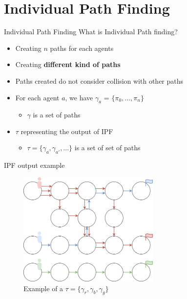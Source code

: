 \section{Individual Path Finding}
\begin{frame}{Individual Path Finding}
    What is Individual Path finding?
    \begin{itemize}
        \item Creating \(n\) paths for each agents
        \item Creating \textbf{different kind of paths}
        \item Paths created do not consider collision with other paths
    \end{itemize}
    \begin{itemize}
        \item For each agent \(a\), we have \(\gamma_a\) = \(\{\pi_0,\dots,\pi_n\}\)
        \begin{itemize}
            \item \(\gamma\) is a set of paths
        \end{itemize}
        \item \(\tau\) representing the output of IPF 
        \begin{itemize}
            \item \(\tau = \{\gamma_a, \gamma_{a'}, ...\}\) is a set of set of paths
        \end{itemize}
    \end{itemize}
\end{frame}


\begin{frame}{IPF output example}
    \begin{figure}[H]
        \centering
        \caption{Example of a \(\tau = \{\gamma_r, \gamma_b, \gamma_g\}\)}\label{fig:ipf_example}
        \includegraphics[width=7cm]{img/ipf_example.drawio.png}
    \end{figure}
\end{frame}



